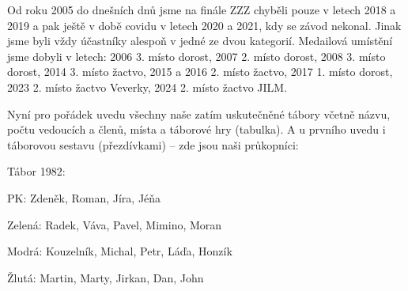 Od roku 2005 do dnešních dnů jsme na finále ZZZ chyběli pouze v letech
2018 a 2019 a pak ještě v době covidu v letech 2020 a 2021, kdy se závod
nekonal. Jinak jsme byli vždy účastníky alespoň v jedné ze dvou
kategorií. Medailová umístění jsme dobyli v letech: 2006 3. místo
dorost, 2007 2. místo dorost, 2008 3. místo dorost, 2014 3. místo
žactvo, 2015 a 2016 2. místo žactvo, 2017 1. místo dorost, 2023 2. místo
žactvo Veverky, 2024 2. místo žactvo JILM.

Nyní pro pořádek uvedu všechny naše zatím uskutečněné tábory včetně
názvu, počtu vedoucích a členů, místa a táborové hry (tabulka). A u
prvního uvedu i táborovou sestavu (přezdívkami) -- zde jsou naši
průkopníci:

Tábor 1982:

PK: Zdeněk, Roman, Jíra, Jéňa

Zelená: Radek, Váva, Pavel, Mimino, Moran

Modrá: Kouzelník, Michal, Petr, Láďa, Honzík

Žlutá: Martin, Marty, Jirkan, Dan, John

